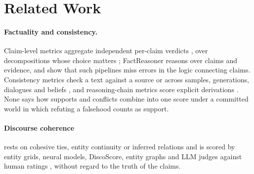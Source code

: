 \section{Related Work}
\label{sec:related}

\paragraph{Factuality and consistency.} Claim-level metrics aggregate independent per-claim verdicts
\citep{factscore,safe,veriscore}, over decompositions whose choice matters \citep{wanner2024};
FactReasoner \citep{factreasoner} reasons over claims and evidence, and \citet{lorefact} show that such
pipelines miss errors in the logic connecting claims. Consistency metrics check a text against a source
or across samples, generations, dialogues and beliefs
\citep{factcc,summac,alignscore,minicheck,selfcheckgpt,mundler2024,welleck2019,decode,ribeiro2019,li2019logic,elazar2021,becel},
and reasoning-chain metrics score explicit derivations \citep{roscoe,receval,entailmentbank,lightman2024}.
None says how supports and conflicts combine into one score under a committed world in which refuting
a falsehood counts as support.

\paragraph{Discourse coherence} rests on cohesive ties, entity continuity or inferred relations
\citep{hallidayhasan1976,grosz1995,hobbs1979,mann,pdtb} and is scored by entity grids, neural models,
DiscoScore, entity graphs and LLM judges \citep{barzilay,li,discoscore,liustrube,geval,zheng2023judge}
against human ratings \citep{gcdc}, without regard to the truth of the claims.

